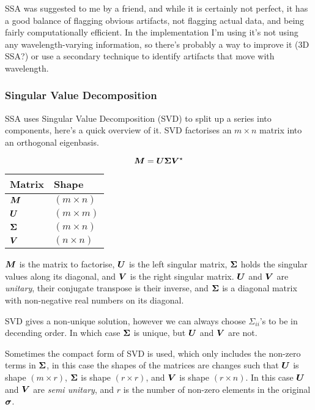 SSA was suggested to me by a friend, and while it is certainly not perfect, it has a good balance of flagging obvious artifacts, not flagging actual data, and being fairly computationally efficient. In the implementation I'm using it's not using any wavelength-varying information, so there's probably a way to improve it (3D SSA?) or use a secondary technique to identify artifacts that move with wavelength.

\subsubsection{Singular Value Decomposition}
SSA uses Singular Value Decomposition (SVD) to split up a series into components, here's a quick overview of it. SVD factorises an $m \times n$ matrix into an orthogonal eigenbasis.

\[
	\bm{M} = \bm{U}\bm{\Sigma}\bm{V}^\star
\]
\begin{center}
\begin{tabular}{l|l}
 Matrix 			& Shape  			\\
 \hline	
 $\bm{M}$ 		& $(m \times n)$ 	\\
 $\bm{U}$ 		& $(m \times m)$ 	\\
 $\bm{\Sigma}$ 	& $(m \times n)$   	\\
 $\bm{V}$ 		& $(n \times n)$ 
\end{tabular}
\end{center}

$\bm{M}$ is the matrix to factorise, $\bm{U}$ is the left singular matrix, $\bm{\Sigma}$ holds the singular values along its diagonal, and $\bm{V}$ is the right singular matrix. $\bm{U}$ and $\bm{V}$ are \emph{unitary}, their conjugate transpose is their inverse, and $\bm{\Sigma}$ is a diagonal matrix with non-negative real numbers on its diagonal.

SVD gives a non-unique solution, however we can always choose $\Sigma_{ii}$'s to be in decending order. In which case $\bm{\Sigma}$ is unique, but $\bm{U}$ and $\bm{V}$ are not.

Sometimes the compact form of SVD is used, which only includes the non-zero terms in $\bm{\Sigma}$, in this case the shapes of the matrices are changes such that $\bm{U}$ is shape $(m \times r)$, $\bm{\Sigma}$ is shape $(r \times r)$, and $\bm{V}$ is shape $(r \times n)$. In this case $\bm{U}$ and $\bm{V}$ are \emph{semi unitary}, and $r$ is the number of non-zero elements in the original $\bm{\sigma}$.


